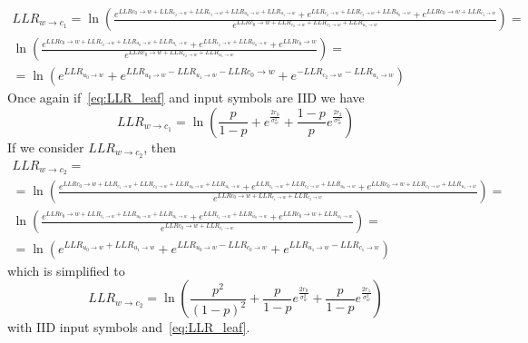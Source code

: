 \documentclass[10pt]{article}
\begin{document}
\begin{multline}
	LLR_{w \rightarrow c_1} = \ln\left(
									\frac{e^{LLR{c_0 \rightarrow w}+LLR_{c_2 \rightarrow w}+LLR_{c_3 \rightarrow w}+LLR_{u_0 \rightarrow w}+LLR_{u_1 \rightarrow w}}+e^{LLR_{c_2 \rightarrow w}+LLR_{c_3 \rightarrow w}+LLR_{u_0 \rightarrow w}}+e^{LLR{c_0 \rightarrow w}+LLR_{c_3 \rightarrow w}}}
									{e^{LLR{c_0 \rightarrow w}+LLR_{c_2 \rightarrow w}+LLR_{c_3 \rightarrow w}+LLR_{u_1 \rightarrow w}}}
								\right) = \\
								\ln\left(
									\frac{e^{LLR{c_0 \rightarrow w}+LLR_{c_2 \rightarrow w}+LLR_{u_0 \rightarrow w}+LLR_{u_1 \rightarrow w}}+e^{LLR_{c_2 \rightarrow w}+LLR_{u_0 \rightarrow w}}+e^{LLR{c_0 \rightarrow w}}}
									{e^{LLR{c_0 \rightarrow w}+LLR_{c_2 \rightarrow w}+LLR_{u_1 \rightarrow w}}}
								\right) = \\
								= \ln\left(e^{LLR_{u_0 \rightarrow w}} + e^{LLR_{u_0 \rightarrow w} - LLR_{u_1 \rightarrow w} - LLR{c_0 \rightarrow w}} + e^{-LLR_{c_2 \rightarrow w}-LLR_{u_1 \rightarrow w}} \right)
\end{multline}
Once again if~\eqref{eq:LLR_leaf} and input symbols are IID we have
\begin{equation}
	LLR_{w \rightarrow c_1} = \ln\left( \frac{p}{1-p} + e^{\frac{2r_0}{\sigma_w^2}} + \frac{1-p}{p}e^{\frac{2r_2}{\sigma_w^2}} \right)
\end{equation}
If we consider $LLR_{w \rightarrow c_2}$, then
\begin{multline}
	LLR_{w \rightarrow c_2} = \\ = \ln\left(
									\frac{e^{LLR{c_0 \rightarrow w}+LLR_{c_1 \rightarrow w}+LLR_{c_3 \rightarrow w}+LLR_{u_0 \rightarrow w}+LLR_{u_1 \rightarrow w}}+e^{LLR_{c_1 \rightarrow w}+LLR_{c_3 \rightarrow w}+LLR_{u_0 \rightarrow w}}+e^{LLR{c_0 \rightarrow w}+LLR_{c_3 \rightarrow w}+LLR_{u_1 \rightarrow w}}}
									{e^{LLR{c_0 \rightarrow w}+LLR_{c_1 \rightarrow w}+LLR_{c_3 \rightarrow w}}}
								\right) = \\
								\ln\left(
									\frac{e^{LLR{c_0 \rightarrow w}+LLR_{c_1 \rightarrow w}+LLR_{u_0 \rightarrow w}+LLR_{u_1 \rightarrow w}}+e^{LLR_{c_1 \rightarrow w}+LLR_{u_0 \rightarrow w}}+e^{LLR{c_0 \rightarrow w}+LLR_{u_1 \rightarrow w}}}
									{e^{LLR{c_0 \rightarrow w}+LLR_{c_1 \rightarrow w}}}
								\right) = \\
								= \ln\left(e^{LLR_{u_0 \rightarrow w}+LLR_{u_1 \rightarrow w}} + e^{LLR_{u_0 \rightarrow w} - LLR_{c_0 \rightarrow w}} + e^{LLR_{u_1 \rightarrow w}-LLR_{c_1 \rightarrow w}} \right)
\end{multline}
which is simplified to 
\begin{equation}
	LLR_{w \rightarrow c_2} = \ln\left( \frac{p^2}{(1-p)^2} + \frac{p}{1-p}e^{\frac{2r_0}{\sigma_w^2}} + \frac{p}{1-p}e^{\frac{2r_1}{\sigma_w^2}} \right)
\end{equation}
with IID input symbols and~\eqref{eq:LLR_leaf}.
\end{document}
